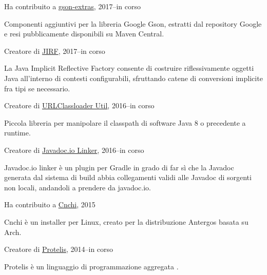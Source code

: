 \documentclass[10pt]{article}
\newenvironment{innerlist}[1][\enskip\textbullet]%
        {\begin{compactitem}[#1]}{\end{compactitem}}
\newcommand{\halfblankline}{\quad\vspace{-0.5\baselineskip}\pagebreak[3]}
\begin{document}
Ha contribuito a \href{https://github.com/DanySK/gson-extras}{gson-extras}, 2017--in corso
\begin{innerlist}
    \item Componenti aggiuntivi per la libreria Google Gson, estratti dal repository Google  e resi pubblicamente disponibili su Maven Central.
\end{innerlist}
\halfblankline

Creatore di \href{https://github.com/DanySK/jirf}{JIRF}, 2017--in corso
\begin{innerlist}
    \item La Java Implicit Reflective Factory consente di costruire riflessivamente oggetti Java all'interno di contesti configurabili, sfruttando catene di conversioni implicite fra tipi se necessario.
\end{innerlist}
\halfblankline

Creatore di \href{https://github.com/DanySK/urlclassloader-util}{URLClassloader Util}, 2016--in corso
\begin{innerlist}
    \item Piccola libreria per manipolare il classpath di software Java 8 o precedente a runtime.
\end{innerlist}
\halfblankline

Creatore di \href{https://github.com/DanySK/javadoc.io-linker}{Javadoc.io Linker}, 2016--in corso
\begin{innerlist}
    \item Javadoc.io linker è un plugin per Gradle in grado di far sì che la Javadoc generata dal sistema di build abbia collegamenti validi alle Javadoc di sorgenti non locali, andandoli a prendere da javadoc.io.
\end{innerlist}
\halfblankline

Ha contribuito a \href{https://github.com/Antergos/Cnchi}{Cnchi}, 2015
\begin{innerlist}
    \item Cnchi è un installer per Linux, creato per la distribuzione Antergos basata su Arch.
\end{innerlist}
\halfblankline

Creatore di \href{http://protelis.org/}{Protelis}, 2014--in corso
\begin{innerlist}
    \item Protelis è un linguaggio di programmazione aggregata \cite{PianiniSAC2015}.
\end{innerlist}
\halfblankline
\end{document}
